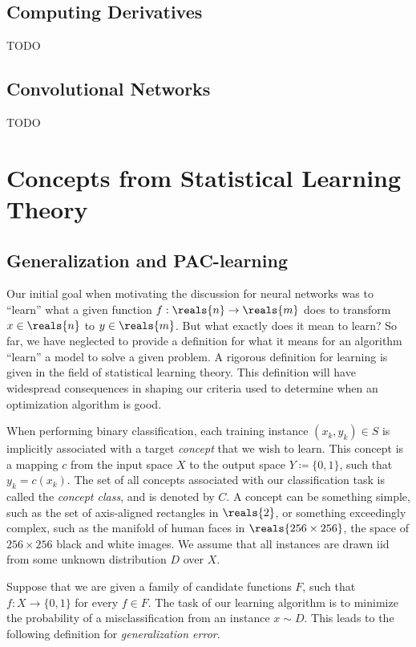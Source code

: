 \documentclass[11pt,a4paper]{article}
\numberwithin{equation}{section}
\begin{document}
\subsection{Computing Derivatives}
\label{sec:computing_derivatives}

TODO

\subsection{Convolutional Networks}

TODO

\section{Concepts from Statistical Learning Theory}

\subsection{Generalization and PAC-learning}

Our initial goal when motivating the discussion for neural networks was to
``learn'' what a given function $f: \reals{n} \to \reals{m}$ does to transform
$x \in \reals{n}$ to $y \in \reals{m}$. But what exactly does it mean to learn?
So far, we have neglected to provide a definition for what it means for an
algorithm ``learn'' a model to solve a given problem. A rigorous definition for
learning is given in the field of statistical learning theory. This definition
will have widespread consequences in shaping our criteria used to determine when
an optimization algorithm is good.

When performing binary classification, each training instance $(x_k, y_k) \in S$
is implicitly associated with a target \emph{concept} that we wish to learn.
This concept is a mapping $c$ from the input space $X$ to the output space $Y
\coloneqq \{0, 1\}$, such that $y_k = c(x_k)$. The set of all concepts
associated with our classification task is called the \emph{concept class}, and
is denoted by $C$. A concept can be something simple, such as the set of
axis-aligned rectangles in $\reals{2}$, or something exceedingly complex, such
as the manifold of human faces in $\reals{256 \times 256}$, the space of $256
\times 256$ black and white images. We assume that all instances are drawn iid
from some unknown distribution $D$ over $X$.

Suppose that we are given a family of candidate functions $F$, such that $f : X
\to \{0, 1\}$ for every $f \in F$. The task of our learning algorithm is to
minimize the probability of a misclassification from an instance $x \sim D$.
This leads to the following definition for \emph{generalization error}.
\end{document}
